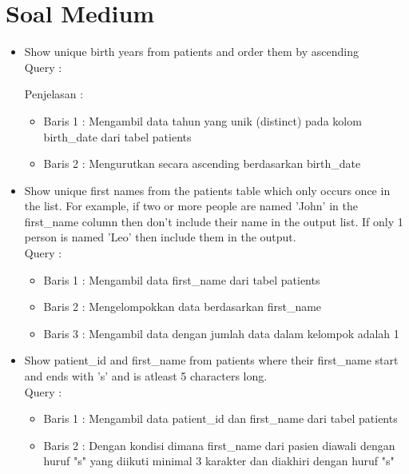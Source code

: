 \documentclass[]{article}
\begin{document}
\section{Soal Medium}
    \begin{itemize}
        \item Show unique birth years from patients and order them by ascending
        \\Query : 
        
        Penjelasan :
        \begin{itemize}
            \item Baris 1 : Mengambil data tahun yang unik (distinct) pada kolom birth\_date dari tabel patients 
            \item Baris 2 : Mengurutkan secara ascending berdasarkan birth\_date
        \end{itemize}

        \item Show unique first names from the patients table which only occurs once in the list. For example, if two or more people are named 'John' in the first\_name column then don't include their name in the output list. If only 1 person is named 'Leo' then include them in the output.
        \\Query :
        
        \begin{itemize}
            \item Baris 1 : Mengambil data first\_name dari tabel patients
            \item Baris 2 : Mengelompokkan data berdasarkan first\_name
            \item Baris 3 : Mengambil data dengan jumlah data dalam kelompok adalah 1
        \end{itemize}

        \item Show patient\_id and first\_name from patients where their first\_name start and ends with 's' and is atleast 5 characters long.
        \\Query :
        
        \begin{itemize}
            \item Baris 1 : Mengambil data patient\_id dan first\_name dari tabel patients
            \item Baris 2 : Dengan kondisi dimana first\_name dari pasien diawali dengan huruf "s" yang diikuti minimal 3 karakter dan diakhiri dengan huruf "s" 
        \end{itemize}


\end{itemize}
\end{document}
